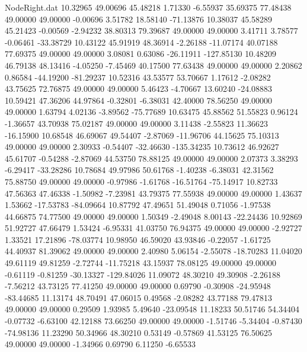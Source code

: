\begin{filecontents}{NodeRight.dat}
  10.32965   49.00696   45.48218     1.71330   -6.55937   35.69375   77.48438   49.00000   49.00000   -0.00696    3.51782   18.58140  -71.13876
  10.38037   45.58289   45.21423    -0.00569   -2.94232   38.80313   79.39687   49.00000   49.00000    3.41711    3.78577   -0.06461  -33.38729
  10.43122   45.91919   48.36914    -2.26188  -11.07174   40.07188   77.69375   49.00000   49.00000    3.08081    0.63086  -26.11911 -127.85130
  10.48209   46.79138   48.13416    -4.05250   -7.45469   40.17500   77.63438   49.00000   49.00000    2.20862    0.86584  -44.19200  -81.29237
  10.52316   43.53577   53.70667     1.17612   -2.08282   43.75625   72.76875   49.00000   49.00000    5.46423   -4.70667   13.60240  -24.08883
  10.59421   47.36206   44.97864    -0.32801   -6.38031   42.40000   78.56250   49.00000   49.00000    1.63794    4.02136   -3.89562  -75.77689
  10.63475   45.88562   51.55823     0.96124   -1.36657   43.70938   75.02187   49.00000   49.00000    3.11438   -2.55823   11.36623  -16.15900
  10.68548   46.69067   49.54407    -2.87069  -11.96706   44.15625   75.10313   49.00000   49.00000    2.30933   -0.54407  -32.46630 -135.34235
  10.73612   46.92627   45.61707    -0.54288   -2.87069   44.53750   78.88125   49.00000   49.00000    2.07373    3.38293   -6.29417  -33.28286
  10.78684   49.97986   50.61768    -1.40238   -6.38031   42.31562   75.88750   49.00000   49.00000   -0.97986   -1.61768  -16.51764  -75.14917
  10.82733   47.56363   47.46338    -1.50982   -7.23981   43.79375   77.55938   49.00000   49.00000    1.43637    1.53662  -17.53783  -84.09664
  10.87792   47.49651   51.49048     0.71056   -1.97538   44.66875   74.77500   49.00000   49.00000    1.50349   -2.49048    8.00143  -22.24436
  10.92869   51.92727   47.66479     1.53424   -6.95331   41.03750   76.94375   49.00000   49.00000   -2.92727    1.33521   17.21896  -78.03774
  10.98950   46.59020   43.93846    -0.22057   -1.61725   44.40937   81.39062   49.00000   49.00000    2.40980    5.06154   -2.55078  -18.70283
  11.04020   49.61119   49.81259    -2.72744  -11.75218   43.15937   78.08125   49.00000   49.00000   -0.61119   -0.81259  -30.13327 -129.84026
  11.09072   48.30210   49.30908    -2.26188   -7.56212   43.73125   77.41250   49.00000   49.00000    0.69790   -0.30908  -24.95948  -83.44685
  11.13174   48.70491   47.06015     0.49568   -2.08282   43.77188   79.47813   49.00000   49.00000    0.29509    1.93985    5.49640  -23.09548
  11.18233   50.51746   54.34404    -0.07732   -6.63100   42.12188   73.66250   49.00000   49.00000   -1.51746   -5.34404   -0.87430  -74.98136
  11.23290   50.34966   48.30210     0.53149   -0.57869   41.53125   76.50625   49.00000   49.00000   -1.34966    0.69790    6.11250   -6.65533

\end{filecontents}
